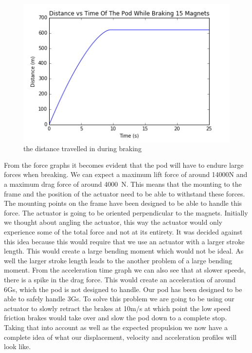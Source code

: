 \documentclass[main.tex]{subfiles}
\begin{document}
    \begin{figure}[H]
        \centering
        \includegraphics[width=\linewidth]{images/distance_time_graph}
        \caption{the distance travelled in during braking}
        \label{fig:distance-profile}
    \end{figure}
    
    From the force graphs it becomes evident that the pod will have to endure large forces when breaking. We can expect a maximum lift force of around 14000N and a maximum drag force of around \SI{4000}{N}. This means that the mounting to the frame and the position of the actuator need to be able to withstand these forces. The mounting points on the frame have been designed to be able to handle this force. The actuator is going to be oriented perpendicular to the magnets. Initially we thought about angling the actuator, this way the actuator would only experience some of the total force and not at its entirety. It was decided against this idea because this would require that we use an actuator with a larger stroke length. This would create a large bending moment which would not be ideal. As well the larger stroke length leads to the another problem of a large bending moment.
    From the acceleration time graph we can also see that at slower speeds, there is a spike in the drag force. This would create an acceleration of around 6Gs, which the pod is not designed to handle. Our pod has been designed to be able to safely handle 3Gs. To solve this problem we are going to be using our actuator to slowly retract the brakes at 10m/s at which point the low speed friction brakes would take over and slow the pod down to a complete stop. 
   Taking that into account as well as the expected propulsion we now have a complete idea of what our displacement, velocity and acceleration profiles will look like.
   
\end{document}
